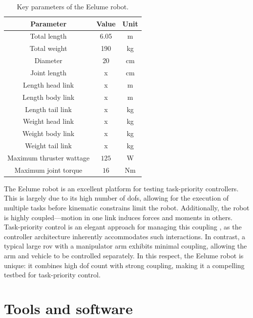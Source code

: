 \begin{table}[h]
    \centering
    \begin{tabular}{|c|c|c|}
        \hline
        Parameter  & Value & Unit   \\ \hline \hline
        Total length & 6.05 & m     \\ \hline
        Total weight & 190  & kg    \\ \hline
        Diameter & 20 & cm    \\ \hline
        Joint length & x & cm    \\ \hline
        Length head link & x & m     \\ \hline
        Length body link & x & m     \\ \hline
        Length tail link & x & kg     \\ \hline
        Weight head link & x & kg     \\ \hline
        Weight body link & x & kg     \\ \hline
        Weight tail link & x & kg     \\ \hline
        Maximum thruster wattage & \(125\) & W     \\ \hline
        Maximum joint torque & \(16\) & Nm     \\ \hline
        \hline
    \end{tabular}
    \caption{Key parameters of the Eelume robot.}
    \label{tab:eelume:keynumbers}
\end{table}
The Eelume robot is an excellent platform for testing task-priority controllers.
This is largely due to its high number of \gls{dof}s, allowing for the 
execution of multiple tasks before kinematic constrains limit the robot. Additionally, 
the robot is highly coupled—motion in one link induces forces and moments in 
others. Task-priority control is an elegant approach for managing this coupling
, as the controller architecture inherently accommodates such interactions. In 
contrast, a typical large \gls{rov} with a manipulator arm exhibits minimal 
coupling, allowing the arm and vehicle to be controlled separately. In this 
respect, the Eelume robot is unique: it combines high \gls{dof} count with 
strong coupling, making it a compelling testbed for task-priority control.

\section{Tools and software}

